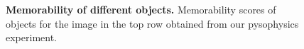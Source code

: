 \begin{figure}[t]
\centering
{}

\vspace{-3mm}

\vspace{-5mm}\caption{\footnotesize\textbf{Memorability of different objects.} Memorability scores of objects for the image in the top row obtained from our pysophysics experiment. }\label{fig:introPhoto}
\end{figure}

%

